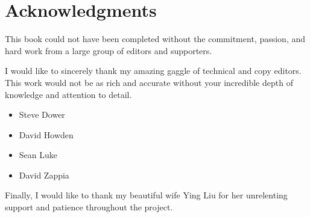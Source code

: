 % 
% 
\section*{Acknowledgments}
This book could not have been completed without the commitment, passion, and hard work from a large group of editors and supporters.

I would like to sincerely thank my amazing gaggle of technical and copy editors. This work would not be as rich and accurate without your incredible depth of knowledge and attention to detail.

\begin{itemize}
	\item Steve Dower
	\item David Howden
	\item Sean Luke
	\item David Zappia
\end{itemize}

Finally, I would like to thank my beautiful wife Ying Liu for her unrelenting support and patience throughout the project.